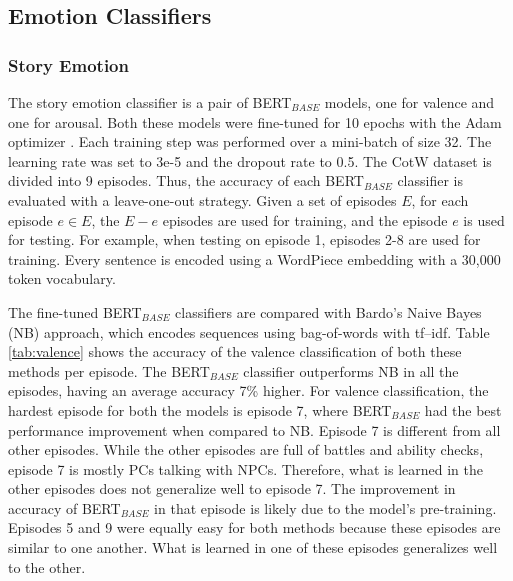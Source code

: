 \subsection{Emotion Classifiers}

\subsubsection{Story Emotion}

The story emotion classifier is a pair of BERT$_{BASE}$ models, one for valence and one for arousal.
Both these models were fine-tuned for 10 epochs with the Adam optimizer \cite{adam14}. Each training step was performed over a mini-batch of size 32. The learning rate was set to 3e-5 and the dropout rate to 0.5. The CotW dataset is divided into 9 episodes. Thus, the accuracy of each BERT$_{BASE}$ classifier is evaluated with a leave-one-out strategy. Given a set of episodes $E$, for each episode $e \in E$, the $E - e$ episodes are used for training, and the episode $e$ is used for testing. For example, when testing on episode 1, episodes 2-8 are used for training. Every sentence is encoded using a WordPiece embedding \cite{wu2016google} with a 30,000 token vocabulary.

The fine-tuned BERT$_{BASE}$ classifiers are compared with Bardo's Naive Bayes (NB) approach, which encodes sequences using bag-of-words with tf–idf. Table \ref{tab:valence} shows the accuracy of the valence classification of both these methods per episode. The BERT$_{BASE}$ classifier outperforms NB in all the episodes, having an average accuracy 7\% higher. For valence classification, the hardest episode for both the models is episode 7, where BERT$_{BASE}$ had the best performance improvement when compared to NB. Episode 7 is different from all other episodes. While the other episodes are full of battles and ability checks, episode 7 is mostly PCs talking with NPCs. Therefore, what is learned in the other episodes does not generalize well to episode 7. The improvement in accuracy of BERT$_{BASE}$ in that episode is likely due to the model's pre-training. Episodes 5 and 9 were equally easy for both methods because these episodes are similar to one another. What is learned in one of these episodes generalizes well to the other.

